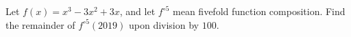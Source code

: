 Let $f(x)=x^3-3x^2+3x$, and let $f^{\circ5}$ mean fivefold function composition. Find the remainder of $f^{\circ5}(2019)$ upon division by $100$.
